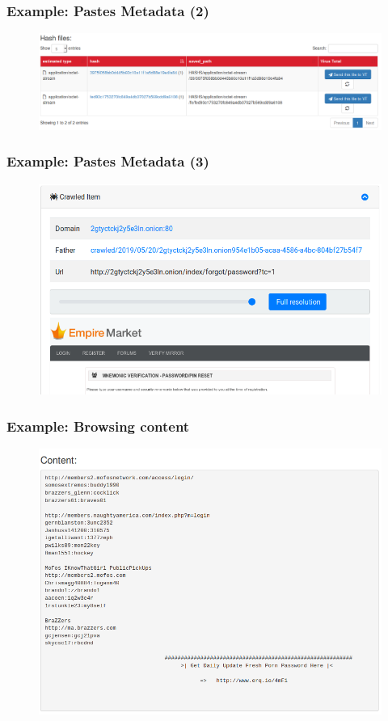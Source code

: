 \documentclass{beamer}
\begin{document}
\begin{frame}
    \frametitle{Example: Pastes Metadata (2)}
    \begin{figure}
        \includegraphics[scale=0.28, angle=0]{images/ail_16.png}
    \end{figure}
\end{frame}

\begin{frame}
    \frametitle{Example: Pastes Metadata (3)}
    \begin{figure}
        \includegraphics[scale=0.28, angle=0]{images/ail_17.png}
    \end{figure}
\end{frame}

\begin{frame}
    \frametitle{Example: Browsing content}
    \begin{figure}
        \includegraphics[scale=0.3, angle=0]{images/ail_04.png}
    \end{figure}
\end{frame}
\end{document}
